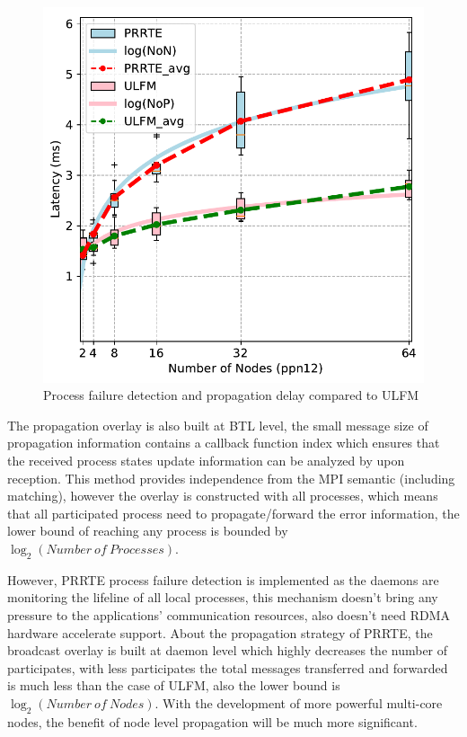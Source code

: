 \documentclass[sigconf]{acmart}
\begin{document}
\begin{figure}[h]
  \centering
  \includegraphics[width=\linewidth]{Process_Failure_log_fit.pdf}
  \caption{Process failure detection and propagation delay compared to ULFM}
\end{figure}

The propagation overlay is also built at BTL level, the small message size of propagation information contains a callback function index which ensures that the received process states update information can be analyzed by upon reception. This method provides independence from the MPI semantic (including matching), however the overlay is constructed with all processes, which means that all participated process need to propagate/forward the error information, the lower bound of reaching any process is bounded by $\log_2({Number\ of\ Processes})$.  

However, PRRTE process failure detection is implemented as the daemons are monitoring the lifeline of all local processes, this mechanism doesn't bring any pressure to the applications' communication resources, also doesn't need RDMA hardware accelerate support. About the propagation strategy of PRRTE, the broadcast overlay is built at daemon level which highly decreases the number of participates, with less participates the total messages transferred and forwarded is much less than the case of ULFM, also the lower bound is $\log_2({Number\ of\ Nodes})$. With the development of more powerful multi-core nodes, the benefit of node level propagation will be much more significant.
\end{document}

